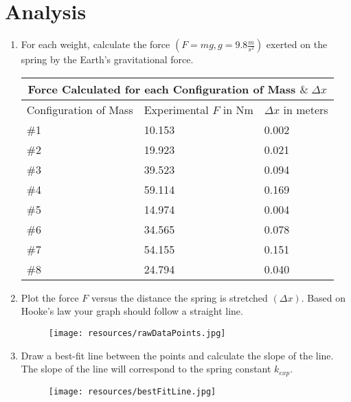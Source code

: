 \chapter{Analysis}

\begin{enumerate}
  \item For each weight, calculate the force $(F = mg, g = 9.8\frac{m}{s^2})$ exerted on
        the spring by the Earth's gravitational force.
	\begin{center}
  	\begin{tabular} { |p{2cm}|p{2cm}|p{2cm}| }
			\hline
  		\multicolumn{3}{|c|}{Force Calculated for each Configuration of Mass $\& \; \Delta x$} \\
			\hline 
			\centering Configuration of Mass & Experimental $F$ in Nm & $\Delta x$ in meters \\ 
			\hline
			\#1 & 10.153 & 0.002 \\
			\hline
			\#2 & 19.923 & 0.021 \\
			\hline
			\#3 & 39.523 & 0.094 \\
			\hline
			\#4 & 59.114 & 0.169 \\
			\hline
			\#5 & 14.974 & 0.004 \\
			\hline
			\#6 & 34.565 & 0.078 \\
			\hline
			\#7 & 54.155 & 0.151 \\
			\hline
			\#8 & 24.794 & 0.040 \\
			\hline
    \end{tabular}
	\end{center}

  \item Plot the force $F$ versus the distance the spring is stretched $(\Delta x)$.
        Based on Hooke's law your graph should follow a straight line.

			\begin{center}
				\begin{figure}[h!]
					\centerline{\texttt{[image: resources/rawDataPoints.jpg]}}
				\end{figure}
			\end{center}

  \item Draw a best-fit line between the points and calculate the slope of the line.
        The slope of the line will correspond to the spring constant $k_{exp}$.

			\begin{center}
				\begin{figure}[h!]
					\centerline{\texttt{[image: resources/bestFitLine.jpg]}}
				\end{figure}
			\end{center}
\end{enumerate}
\restoregeometry